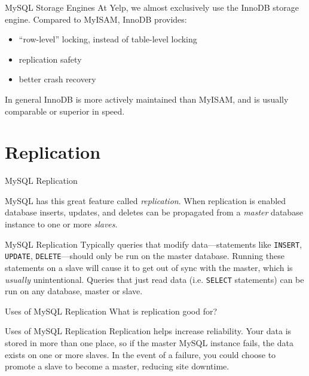 \documentclass[14pt]{beamer}
\newcommand{\myitem}{\item[\textbullet]}
\begin{document}
\begin{frame}{MySQL Storage Engines}
  At Yelp, we
  almost exclusively use the InnoDB storage engine. Compared to MyISAM, InnoDB provides:
  \begin{itemize}
    \myitem ``row-level'' locking, instead of table-level locking
    \myitem replication safety
    \myitem better crash recovery
  \end{itemize}
  In general InnoDB is more actively maintained than MyISAM, and is usually
  comparable or superior in speed.
\end{frame}

\section{Replication}

\begin{frame}{MySQL Replication}

  MySQL has this great feature called \emph{replication}.
  \newline
  \newline
  When replication is
  enabled database inserts, updates, and deletes can be propagated from a \emph{master} database
  instance to one or more \emph{slaves}.
\end{frame}

\begin{frame}{MySQL Replication}
  Typically queries that modify data---statements like \texttt{INSERT},
  \texttt{UPDATE}, \texttt{DELETE}---should only be run on the master
  database. Running these statements on a slave will cause it to get out of sync
  with the master, which is \emph{usually} unintentional.
  \newline
  \newline
  Queries that just read data (i.e. \texttt{SELECT} statements) can be run on any database, master or slave.
\end{frame}

\begin{frame}{Uses of MySQL Replication}
  What is replication good for?
\end{frame}

\begin{frame}{Uses of MySQL Replication}
  Replication helps increase reliability. Your data is stored in more than one
  place, so if the master MySQL instance fails, the data exists on one or more slaves.
  \newline
  \newline
  In the event of a failure, you could choose to promote a slave to become a
  master, reducing site downtime.
\end{frame}
\end{document}
